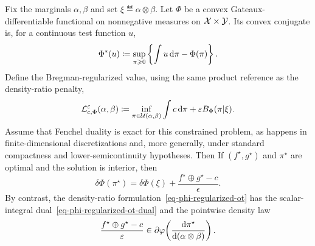 \begin{prop}\label{prop-bregman-phi-dual-comparison}
	Fix the marginals $\alpha,\beta$ and set $\xi\eqdef\alpha\otimes\beta$. Let $\Phi$ be a convex Gateaux-differentiable functional on nonnegative measures on $\mathcal{X}\times\mathcal{Y}$. Its convex conjugate is, for a continuous test function $u$,
	\[
		\Phi^*(u)
		\coloneqq
		\sup_{\pi\geqslant0}
		\left\{
			\int u\,\mathrm{d}\pi-\Phi(\pi)
		\right\}.
	\]
	Define the Bregman-regularized value, using the same product reference as the density-ratio penalty,
	\[
		\mathcal{L}_{c,\Phi}^{\varepsilon}(\alpha,\beta)
		\coloneqq
		\inf_{\pi\in\mathcal{U}(\alpha,\beta)}
		\int c\,\mathrm{d}\pi+\varepsilon B_\Phi(\pi|\xi).
	\]
	Assume that Fenchel duality is exact for this constrained problem, as happens in finite-dimensional discretizations and, more generally, under standard compactness and lower-semicontinuity hypotheses. Then
	If $(f^\star,g^\star)$ and $\pi^\star$ are optimal and the solution is interior, then
	\[
		\delta\Phi(\pi^\star)
		=
		\delta\Phi(\xi)+\frac{f^\star\oplus g^\star-c}{\epsilon}.
	\]
	By contrast, the density-ratio formulation~\eqref{eq-phi-regularized-ot} has the scalar-integral dual~\eqref{eq-phi-regularized-ot-dual} and the pointwise density law
	\[
		\frac{f^\star\oplus g^\star-c}{\varepsilon}
		\in
		\partial\varphi\!\left(
			\frac{\mathrm{d}\pi^\star}{\mathrm{d}(\alpha\otimes\beta)}
		\right).
	\]
\end{prop}

